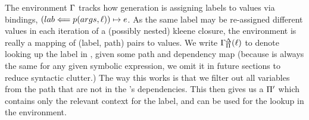 The environment $\Gamma$ tracks how generation is assigning labels to values via bindings,
$(lab \Longleftarrow p(args, \ell)) \mapsto e$.
As the same label may be re-assigned different values in each iteration of a
(possibly nested) kleene closure,
the environment is really a mapping of (label, path) pairs to values.
We write $\Gamma^\Delta_\Pi(\ell)$
to denote looking up the label \lab in \env,
given some path and dependency map
(because \deps is always the same for any given symbolic expression,
we omit it in future sections to reduce syntactic clutter.)
The way this works is that
we filter out all variables from
the path that are not in the \lab's dependencies.
This then gives us a $\Pi'$ which contains only the
relevant context for the label,
and can be used for the lookup in the environment.




